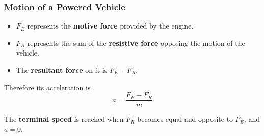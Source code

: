 \subsubsection*{Motion of a Powered Vehicle}

\begin{itemize}
    \item $F_E$ represents the \textbf{motive force} provided by the engine.
    \item $F_R$ represents the sum of the \textbf{resistive force} opposing the motion of the vehicle.
    \item The \textbf{resultant force} on it is $F_E-F_R$.
\end{itemize}
Therefore its acceleration is
$$a=\frac{F_E-F_R}{m}$$

The \textbf{terminal speed} is reached when $F_R$ becomes equal and opposite to $F_E$, and $a=0$.
